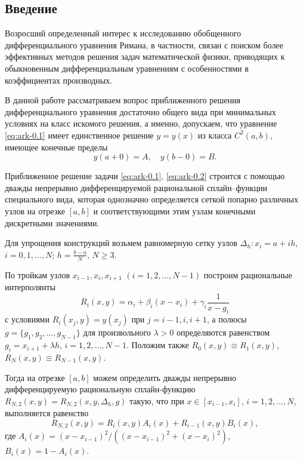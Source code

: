 \subsection{Введение}

Возросший определенный интерес к исследованию обобщенного дифференциального уравнения 
Римана, в частности, связан с поиском более эффективных методов решения задач 
математической физики, приводящих к обыкновенным дифференциальным уравнениям 
с особенностями в коэффициентах производных.

В данной работе рассматриваем вопрос приближенного решения дифференциального уравнения
достаточно общего вида при минимальных условиях на класс искомого решения, а именно,  
допускаем, что уравнение \eqref{eq:ark-0.1} имеет единственное решение
$y=y(x)$ из класса $C^2(a,b)$, имеющее конечные пределы
\begin{equation}\label{eq:ark-0.2}
y(a+0)=A,\quad y(b-0)=B.
\end{equation}

Приближенное решение задачи \eqref{eq:ark-0.1}, \eqref{eq:ark-0.2} строится с помощью дважды
 непрерывно дифференцируемой рациональной сплайн--функции специального вида,
 которая однозначно определяется сеткой попарно различных узлов на отрезке $[a,b]$ и 
соответствующими этим узлам конечными дискретными значениями. 

Для упрощения конструкций возьмем равномерную сетку узлов
$\Delta_h: x_i=a+ih$, $i=0,1,\dots,N$; $h=\frac{b-a}N$, $N\geqslant 3$.

По тройкам узлов $x_{i-1}, x_i, x_{i+1}$ $(i=1,2,\dots,N-1)$ 
построим \cite{bib:ark-11} рациональные интерполянты
\begin{equation}\label{eq:ark-0.3}
R_i(x,y)=\alpha_i+\beta_i(x-x_i)+\gamma_i\frac 1{x-g_i}
\end{equation}
с условиями $R_i(x_j,y)=y(x_j)$ при $j=i-1,i,i+1$, а полюсы
$g=\{g_1,g_2,\dots,g_{N-1}\}$ для произвольного $\lambda>0$ определяются 
равенством $g_i=x_{i+1}+\lambda h$, $i=1,2,\dots,N-1.$ Положим также
$R_0(x,y)\equiv R_1(x,y)$, $R_N(x,y)\equiv R_{N-1}(x,y)$.

Тогда на отрезке $[a,b]$ можем определить \cite{bib:ark-12} дважды 
непрерывно дифференцируемую рациональную сплайн-функцию 
$R_{N,2}(x,y)=R_{N,2}(x,y,\Delta_h,g)$ такую, что при $x\in[x_{i-1}, x_i]$,
$i=1,2,\dots,N$, выполняется равенство
\begin{equation}\label{eq:ark-0.4}
R_{N,2}(x,y)=R_i(x,y)A_i(x)+R_{i-1}(x,y)B_i(x),
\end{equation}
где $A_i(x)=(x-x_{i-1})^2/((x-x_{i-1})^2+(x-x_i)^2)$, $B_i(x)=1-A_i(x)$.

